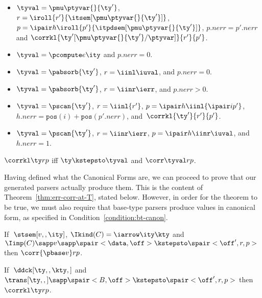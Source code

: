 \begin{definition}
\begin{itemize}
  \item $\tyval = \pmu \ptyvar {} {\ty'}$, 
    $r = \iroll{r'}{\itsem[\pmu \ptyvar {} {\ty'}]}$, $p =
    \ipair h {\iroll{p'}{
                \itpdsem[\pmu \ptyvar {} {\ty'}]}}$, 
        $p.{nerr} = p'.{nerr}$ 
    and \linebreak
    $\corrkl {\ty'[\pmu \ptyvar {} {\ty'}/\ptyvar]} {r'} {p'}$.
  \item $\tyval = \pcompute e \ity$ and $p.{nerr} = 0$.
  \item $\tyval = \pabsorb {\ty'}$, $r = \iinl \iuval$, and $p.nerr = 0$.
  \item $\tyval = \pabsorb {\ty'}$, $r = \iinr \ierr$, and $p.nerr > 0$.
  \item $\tyval = \pscan {\ty'}$, $r =\iinl {r'}$,
      $p = \ipair h {\iinl {\ipair i {p'}}}$,
      $h.nerr = \mathtt{pos}(i) + \mathtt{pos}(p'.nerr)$, and \linebreak
      $\, \corrkl {\ty'}{r'}{p'}$.
  \item $\tyval = \pscan {\ty'}$,
      $r =\iinr \ierr$,
      $p = \ipair h {\iinr \iuval}$, and
      $h.{nerr} = 1$.
  \end{itemize}
\end{definition}

\begin{definition}
$\corrkl \ty r p$ iff $\ty \kstepsto \tyval$ and $\corr \tyval r p$.
\end{definition}

Having defined what the Canonical Forms are, we can proceed to prove that
our generated parsers actually produce them.
This is the content of Theorem~\ref{thm:err-corr-at-T}, stated below. 
However, in order for the theorem to be true, we must also require
that base-type parsers produce values in canonical form, as
specified in Condition~\ref{condition:bt-canon}.

\begin{condition}
\label{condition:bt-canon}
  If $\;\stsem[v,,\ity]$, $\Ikind(C) = \iarrow \ity \kty$ and $\Iimp(C)
  \sapp v \sapp \spair<\data,\off> \kstepsto \spair<\off',r,p>$ then
  $\corr {\pbase v} r p $.
\end{condition}

\begin{theorem}
\label{thm:err-corr-at-T}
If $\; \ddck[\ty,,\kty,]$ and $\trans[\ty,,] \sapp \spair<B,\off> \kstepsto
  \spair<\off',r,p>$ then $\corrkl \ty r p$.
\end{theorem}

